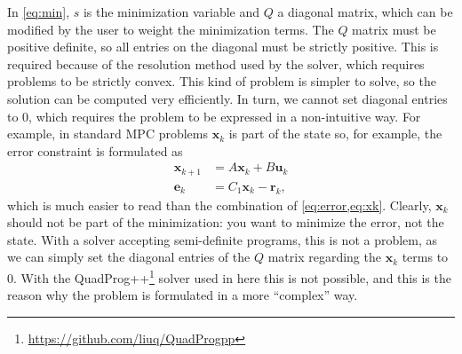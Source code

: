 \documentclass[10pt,a4paper]{article}
\newcommand{\xk}{\ensuremath{\bm{x}_k}\xspace}
\newcommand{\xkk}{\ensuremath{\bm{x}_{k+1}}\xspace}
\newcommand{\uk}{\ensuremath{\bm{u}_k}\xspace}
\newcommand{\ek}{\ensuremath{\bm{e}_k}\xspace}
\newcommand{\rk}{\ensuremath{\bm{r}_k}\xspace}
\newcommand{\Co}{\ensuremath{C_1}}
\begin{document}
In \cref{eq:min}, $s$ is the minimization variable and $Q$ a diagonal matrix, which can be modified by the user to weight the minimization terms.
The $Q$ matrix must be positive definite, so all entries on the diagonal must be strictly positive.
This is required because of the resolution method used by the solver, which requires problems to be strictly convex.
This kind of problem is simpler to solve, so the solution can be computed very efficiently.
In turn, we cannot set diagonal entries to 0, which requires the problem to be expressed in a non-intuitive way.
For example, in standard MPC problems \xk is part of the state so, for example, the error constraint is formulated as
\begin{align}
    \xkk &= A\xk + B\uk\\
    \ek &= \Co\xk - \rk,
\end{align}
which is much easier to read than the combination of \cref{eq:error,eq:xk}.
Clearly, \xk should not be part of the minimization: you want to minimize the error, not the state.
With a solver accepting semi-definite programs, this is not a problem, as we can simply set the diagonal entries of the $Q$ matrix regarding the \xk terms to 0.
With the QuadProg++\footnote{\url{https://github.com/liuq/QuadProgpp}} solver used in here this is not possible, and this is the reason why the problem is formulated in a more ``complex'' way.
\end{document}
